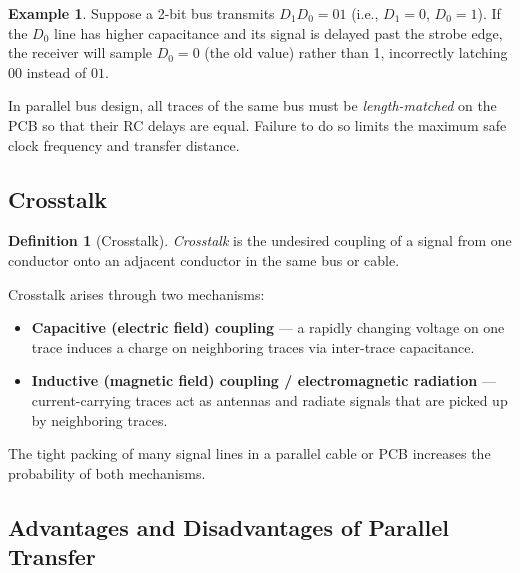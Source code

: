 \documentclass[11pt, a4paper, notitlepage]{report}
\theoremstyle{definition}
\newtheorem{definition}[theorem]{Definition}
\theoremstyle{remark}
\theoremstyle{definition}
\newtheorem{example}[theorem]{Example}
\begin{document}
\begin{example}
  Suppose a 2-bit bus transmits $D_1 D_0 = 01$ (i.e., $D_1 = 0$, $D_0 = 1$). If the $D_0$ line has higher capacitance and its signal is delayed past the strobe edge, the receiver will sample $D_0 = 0$ (the old value) rather than 1, incorrectly latching $00$ instead of $01$.
\end{example}

\begin{examtip}[title={Exam Tip: Skew is the Key Limiter of Parallel Bus Speed}]
  In parallel bus design, all traces of the same bus must be \emph{length-matched} on the PCB so that their RC delays are equal. Failure to do so limits the maximum safe clock frequency and transfer distance.
\end{examtip}

\subsection{Crosstalk}
\label{sec:crosstalk}

\begin{definition}[Crosstalk]
  \label{def:crosstalk}
  \emph{Crosstalk} is the undesired coupling of a signal from one conductor onto an adjacent conductor in the same bus or cable.
\end{definition}

Crosstalk arises through two mechanisms:
\begin{itemize}
  \item \textbf{Capacitive (electric field) coupling} — a rapidly changing voltage on one trace induces a charge on neighboring traces via inter-trace capacitance.
  \item \textbf{Inductive (magnetic field) coupling / electromagnetic radiation} — current-carrying traces act as antennas and radiate signals that are picked up by neighboring traces.
\end{itemize}

The tight packing of many signal lines in a parallel cable or PCB increases the probability of both mechanisms.

\subsection{Advantages and Disadvantages of Parallel Transfer}
\label{sec:parallel-pros-cons}
\end{document}
